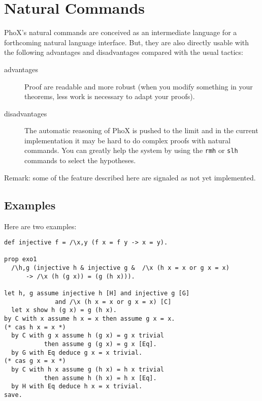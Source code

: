 
\chapter{Natural Commands}

PhoX's natural commands are conceived as an intermediate language for
a forthcoming natural language interface. But, they are also directly
usable with the following advantages and disadvantages compared with
the usual tactics:

\begin{description}
\item[advantages] Proof are readable and more robust (when you modify
something in your theorems, less work is necessary to adapt your
proofs).
\item[disadvantages] The automatic reasoning of PhoX is pushed to the
limit and in the current implementation it may be hard to do complex
proofs with natural commands. You can greatly help the system by using
the \verb#rmh# or \verb#slh# commands to select the hypotheses.  
\end{description}

Remark: some of the feature described here are signaled as not yet
implemented.

\section{Examples}

Here are two examples:

\begin{verbatim}
def injective f = /\x,y (f x = f y -> x = y).

prop exo1 
  /\h,g (injective h & injective g &  /\x (h x = x or g x = x) 
      -> /\x (h (g x)) = (g (h x))).

let h, g assume injective h [H] and injective g [G] 
              and /\x (h x = x or g x = x) [C] 
  let x show h (g x) = g (h x).
by C with x assume h x = x then assume g x = x.
(* cas h x = x *)  
  by C with g x assume h (g x) = g x trivial 
           then assume g (g x) = g x [Eq].
  by G with Eq deduce g x = x trivial.
(* cas g x = x *)
  by C with h x assume g (h x) = h x trivial 
           then assume h (h x) = h x [Eq].
  by H with Eq deduce h x = x trivial.
save.
\end{verbatim}


